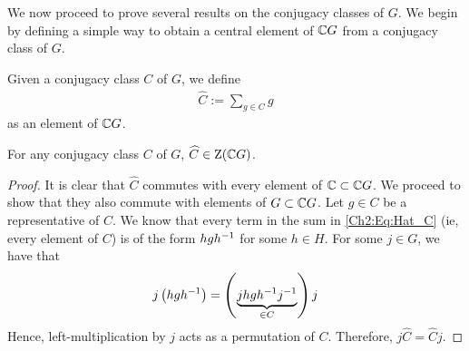 We now proceed to prove several results on the conjugacy classes of $G$. We begin by defining a simple way to obtain a central element of $\mathbb{C} G$ from a conjugacy class of $G$.

\begin{boxnotation}
    Given a conjugacy class $C$ of $G$, we define
    \begin{align}
        \hat{C} := \sum_{g \in C} g
        \label{Ch2:Eq:Hat_C}
    \end{align}
    as an element of $\mathbb{C} G$.
\end{boxnotation}

\begin{lemma}
    For any conjugacy class $C$ of $G$, $\widehat{C} \in \operatorname{Z}\!\left( \mathbb{C} G \right)$.
\end{lemma}
\begin{proof}
    It is clear that $\hat{C}$ commutes with every element of $\mathbb{C} \subset \mathbb{C} G$. We proceed to show that they also commute with elements of $G \subset \mathbb{C} G$. Let $g \in C$ be a representative of $C$. We know that every term in the sum in \eqref{Ch2:Eq:Hat_C} (ie, every element of $C$) is of the form $hgh^{-1}$ for some $h \in H$. For some $j \in G$, we have that
    \begin{align*}
        j\left( hgh^{-1} \right) = \left( \underbrace{j h g h^{-1} j^{-1}}_{\in C} \right) j
    \end{align*}
    Hence, left-multiplication by $j$ acts as a permutation of $C$. Therefore, $j \hat{C} = \hat{C} j$.
\end{proof}

